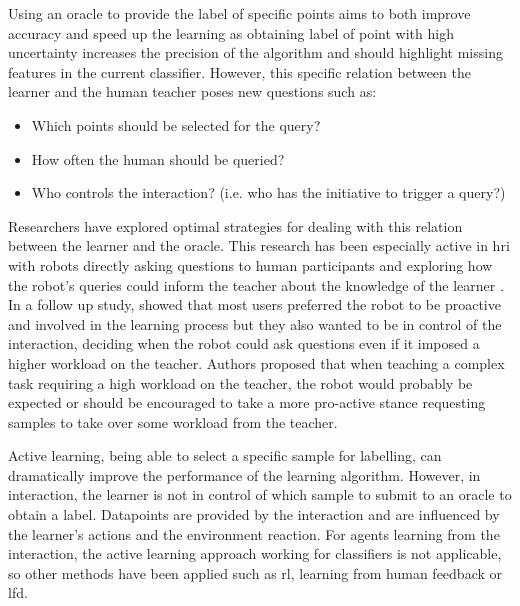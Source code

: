 Using an oracle to provide the label of specific points aims to both improve accuracy and speed up the learning as obtaining label of point with high uncertainty increases the precision of the algorithm and should highlight missing features in the current classifier. However, this specific relation between the learner and the human teacher poses new questions such as: 
\begin{itemize}
	\item Which points should be selected for the query?
	\item How often the human should be queried?
	\item Who controls the interaction? (i.e. who has the initiative to trigger a query?)
\end{itemize}

Researchers have explored optimal strategies for dealing with this relation between the learner and the oracle. This research has been especially active in \gls{hri} with robots directly asking questions to human participants and exploring how the robot's queries could inform the teacher about the knowledge of the learner \citep{chao2010transparent}. In a follow up study, \cite{cakmak2010designing} showed that most users preferred the robot to be proactive and involved in the learning process but they also wanted to be in control of the interaction, deciding when the robot could ask questions even if it imposed a higher workload on the teacher. Authors proposed that when teaching a complex task requiring a high workload on the teacher, the robot would probably be expected or should be encouraged to take a more pro-active stance requesting samples to take over some workload from the teacher.

Active learning, being able to select a specific sample for labelling, can dramatically improve the performance of the learning algorithm. However, in interaction, the learner is not in control of which sample to submit to an oracle to obtain a label. Datapoints are provided by the interaction and are influenced by the learner's actions and the environment reaction. For agents learning from the interaction, the active learning approach working for classifiers is not applicable, so other methods have been applied such as \gls{rl}, learning from human feedback or \gls{lfd}.


